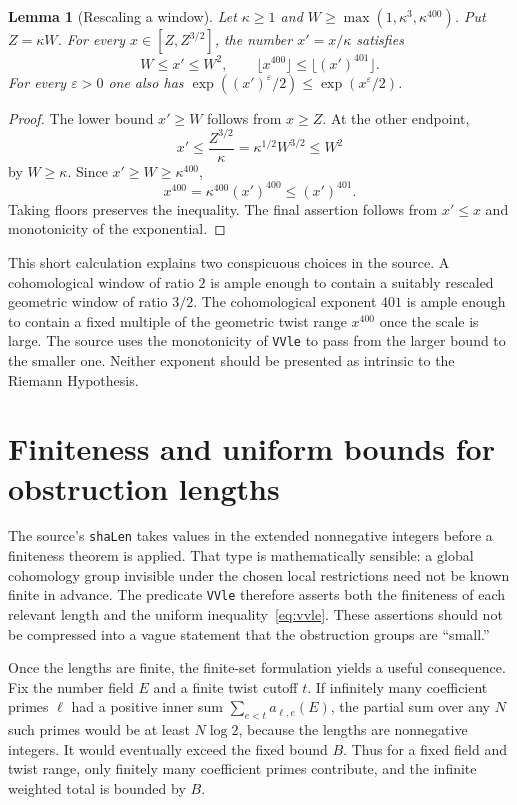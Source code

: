 \documentclass[11pt,openany,oneside]{scrbook}
\newtheorem{lemma}[theorem]{Lemma}
\theoremstyle{definition}
\theoremstyle{remark}
\newcommand{\eps}{\varepsilon}
\begin{document}
\begin{lemma}[Rescaling a window]\label{lem:window-rescaling}
Let $\kappa\ge1$ and $W\ge\max(1,\kappa^3,\kappa^{400})$.  Put $Z=\kappa W$.  For every $x\in[Z,Z^{3/2}]$, the number $x'=x/\kappa$ satisfies
\[
W\le x'\le W^2,
\qquad \lfloor x^{400}\rfloor\le\lfloor(x')^{401}\rfloor.
\]
For every $\eps>0$ one also has $\exp((x')^\eps/2)\le\exp(x^\eps/2)$.
\end{lemma}
\begin{proof}
The lower bound $x'\ge W$ follows from $x\ge Z$.  At the other endpoint,
\[
x'\le\frac{Z^{3/2}}{\kappa}
=\kappa^{1/2}W^{3/2}\le W^2
\]
by $W\ge\kappa$.  Since $x'\ge W\ge\kappa^{400}$,
\[
x^{400}=\kappa^{400}(x')^{400}\le(x')^{401}.
\]
Taking floors preserves the inequality.  The final assertion follows from $x'\le x$ and monotonicity of the exponential.
\end{proof}

This short calculation explains two conspicuous choices in the source.  A cohomological window of ratio $2$ is ample enough to contain a suitably rescaled geometric window of ratio $3/2$.  The cohomological exponent $401$ is ample enough to contain a fixed multiple of the geometric twist range $x^{400}$ once the scale is large.  The source uses the monotonicity of \texttt{VVle} to pass from the larger bound to the smaller one.  Neither exponent should be presented as intrinsic to the Riemann Hypothesis.

\section{Finiteness and uniform bounds for obstruction lengths}\label{sec:window-finiteness}

The source's \texttt{shaLen} takes values in the extended nonnegative integers before a finiteness theorem is applied.  That type is mathematically sensible: a global cohomology group invisible under the chosen local restrictions need not be known finite in advance.  The predicate \texttt{VVle} therefore asserts both the finiteness of each relevant length and the uniform inequality~\eqref{eq:vvle}.  These assertions should not be compressed into a vague statement that the obstruction groups are ``small.''

Once the lengths are finite, the finite-set formulation yields a useful consequence.  Fix the number field $E$ and a finite twist cutoff $t$.  If infinitely many coefficient primes $\ell$ had a positive inner sum $\sum_{e<t}a_{\ell,e}(E)$, the partial sum over any $N$ such primes would be at least $N\log2$, because the lengths are nonnegative integers.  It would eventually exceed the fixed bound $B$.  Thus for a fixed field and twist range, only finitely many coefficient primes contribute, and the infinite weighted total is bounded by $B$.
\end{document}

